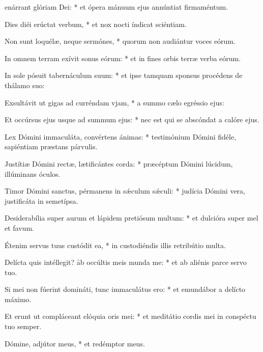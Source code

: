 \begin{psalmus}
    
     enárrant glóriam Dei: * et ópera mánuum ejus annúntiat firmaméntum.
    
    Dies diéi erúctat verbum, * et nox nocti índicat sciéntiam.
    
    Non sunt loquélæ, neque sermónes, * quorum non audiántur voces eórum.
    
    In omnem terram exívit sonus eórum: * et in fines orbis terræ verba eórum.
    
    In sole pósuit tabernáculum suum: * et ipse tamquam sponsus procédens de thálamo suo:
    
    Exsultávit ut gigas ad curréndam vjam, * a summo cælo egréssio ejus:
    
    Et occúrsus ejus usque ad summum ejus: * nec est qui se abscóndat a calóre ejus.
    
    Lex Dómini immaculáta, convértens ánimas: * testimónium Dómini fidéle, sapiéntiam præstans párvulis.
    
    Justítiæ Dómini rectæ, lætificántes corda: * præcéptum Dómini lúcidum, illúminans óculos.
    
    Timor Dómini sanctus, pérmanens in sǽculum sǽculi: * judícia Dómini vera, justificáta in semetípsa.
    
    Desiderabília super aurum et lápidem pretiósum multum: * et dulcióra super mel et favum.
    
    Étenim servus tuus custódit ea, * in custodiéndis illis retribútio multa.
    
    Delícta quis intéllegit? \f ab occúltis meis munda me: * et ab aliénis parce servo tuo.
    
    Si mei non fúerint domináti, tunc immaculátus ero: * et emundábor a delícto máximo.
    
    Et erunt ut compláceant elóquia oris mei: * et meditátio cordis mei in conspéctu tuo semper.
    
    Dómine, adjútor meus, * et redémptor meus.
    
    \end{psalmus}
